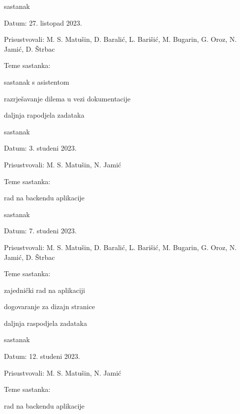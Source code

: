 \begin{packed_enum}
			\item  sastanak
			\item[] \begin{packed_item}
				\item Datum: 27. listopad 2023.
				\item Prisustvovali: M. S. Matušin, D. Baralić, L. Barišić, M. Bugarin, G. Oroz, N. Jamić, D. Štrbac
				\item Teme sastanka:
				\begin{packed_item}
					\item  sastanak s asistentom
					\item  razrješavanje dilema u vezi dokumentacije
					\item daljnja rapodjela zadataka
				\end{packed_item}
			\end{packed_item}
			
			\item  sastanak
			\item[] \begin{packed_item}
				\item Datum: 3. studeni 2023.
				\item Prisustvovali: M. S. Matušin, N. Jamić
				\item Teme sastanka:
				\begin{packed_item}
					\item  rad na backendu aplikacije
				\end{packed_item}
			\end{packed_item}
			
			\item  sastanak
			\item[] \begin{packed_item}
				\item Datum: 7. studeni 2023.
				\item Prisustvovali: M. S. Matušin, D. Baralić, L. Barišić, M. Bugarin, G. Oroz, N. Jamić, D. Štrbac
				\item Teme sastanka:
				\begin{packed_item}
					\item  zajednički rad na aplikaciji
					\item  dogovaranje za dizajn stranice
					\item daljnja raspodjela zadataka
				\end{packed_item}
			\end{packed_item}
			
			\item  sastanak
			\item[] \begin{packed_item}
				\item Datum: 12. studeni 2023.
				\item Prisustvovali: M. S. Matušin, N. Jamić
				\item Teme sastanka:
				\begin{packed_item}
					\item  rad na backendu aplikacije
				\end{packed_item}
			\end{packed_item}
			

\end{packed_enum}
